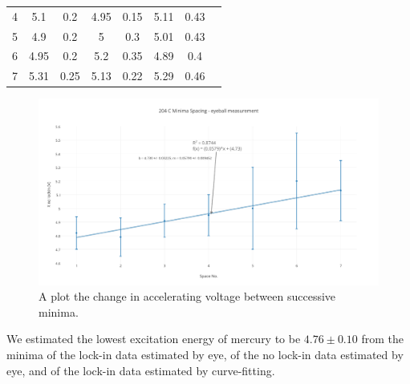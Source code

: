 \documentclass[prb,preprint]{revtex4-1}
\begin{document}
\begin{table}[h!]
\begin{ruledtabular}
\begin{tabular}{cccccccl}
4         & 5.1                                          & 0.2                                         & 4.95                                             & 0.15                                            & 5.11                                           & 0.43                                           \\
5         & 4.9                                          & 0.2                                         & 5                                                & 0.3                                             & 5.01                                           & 0.43                                           \\
6         & 4.95                                         & 0.2                                         & 5.2                                              & 0.35                                            & 4.89                                           & 0.4                                            \\
7         & 5.31                                         & 0.25                                        & 5.13                                             & 0.22                                            & 5.29                                           & 0.46                                          
\end{tabular}
\end{ruledtabular}
\label{minimaSpacing}
\end{table}

\begin{figure}[h!]
\centering
\includegraphics[width=6in]{204C_minima_eyeball.pdf}
\caption{A plot the change in accelerating voltage between successive minima.}
\label{nomineye}
\end{figure}


We estimated the lowest excitation energy of mercury to be $4.76\pm0.10$ from the minima of the lock-in data estimated by eye, of the no lock-in data estimated by eye, and of the lock-in data estimated by curve-fitting.
\end{document}
